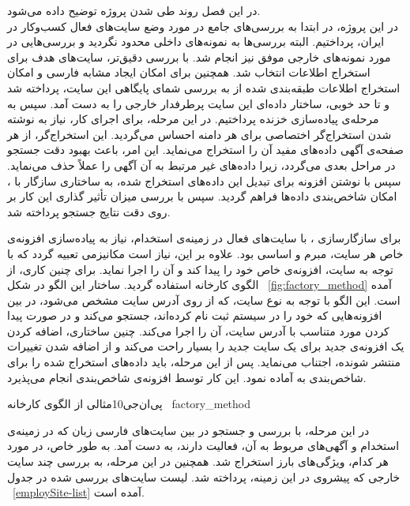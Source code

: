 
در اين فصل روند طی شدن پروژه توضيح داده می‌شود.
\\
در این پروژه، در ابتدا به بررسی‌های جامع در مورد وضع سایت‌های فعال کسب‌و‌کار در ایران، پرداختیم. البته بررسی‌ها به نمونه‌های داخلی محدود نگردید و بررسی‌هایی در مورد نمونه‌های خارجی موفق نیز انجام شد. با بررسی دقیق‌تر، سایت‌های هدف برای استخراج اطلاعات انتخاب شد. همچنین برای امکان ایجاد مشابه فارسی  و امکان استخراج اطلاعات طبقه‌بندی شده از  به بررسی شمای پایگاهی این سایت، پرداخته شد و تا حد خوبی، ساختار داده‌ای این سایت پرطرفدار خارجی را به دست آمد. سپس به مرحله‌ی پیاده‌سازی خزنده پرداختیم. در این مرحله، برای اجرای کار، نیاز به نوشته شدن استخراج‌گر اختصاصی برای هر دامنه احساس می‌گردید. این استخراج‌گر، از هر صفحه‌ی آگهی داده‌های مفید آن را استخراج می‌نماید. این امر، باعث بهبود دقت جستجو در مراحل بعدی می‌گردد، زیرا داده‌های غیر مرتبط به آن آگهی را عملاً حذف می‌نماید. سپس با نوشتن افزونه برای تبدیل این داده‌های استخراج شده، به ساختاری سازگار با ، امکان شاخص‌بندی داده‌ها فراهم گردید. سپس با بررسی میزان تأثیر گذاری این کار بر روی دقت نتایج جستجو پرداخته شد.

برای سازگارسازی ، با سایت‌های فعال در زمینه‌ی استخدام، نیاز به پیاده‌سازی افزونه‌ی خاص هر سایت، مبرم و اساسی بود. علاوه بر این، نیاز است مکانیزمی تعبیه گردد که با توجه به سایت، افزونه‌ی خاص خود را پیدا کند و آن را اجرا نماید. برای چنین کاری، از الگوی کارخانه استفاده گردید. ساختار این الگو در شکل ~\ref{fig:factory_method} آمده است. این الگو با توجه به نوع سایت، که از روی آدرس سایت مشخص می‌شود، در بین افزونه‌هایی که خود را در سیستم ثبت نام کرده‌اند، جستجو می‌کند و در صورت پیدا کردن مورد متناسب با آدرس سایت، آن را اجرا می‌کند. چنین ساختاری، اضافه کردن یک افزونه‌ی جدید برای یک سایت جدید را بسیار راحت می‌کند و از اضافه شدن تغییرات منتشر شونده، اجتناب می‌نماید. پس از این مرحله، باید داده‌های استخراج شده را برای شاخص‌بندی به  آماده نمود. این کار توسط افزونه‌ی شاخص‌بندی انجام می‌پذیرد.

‌پی‌ان‌جی{10}{مثالی از الگوی کارخانه
~\cite{Factory-method}}{factory_method}

در این مرحله، با بررسی و جستجو در بین سایت‌های فارسی زبان که در زمینه‌ی استخدام و آگهی‌های مربوط به آن، فعالیت دارند، به دست آمد. به طور خاص، در مورد هر کدام، ویژگی‌های بارز استخراج شد. همچنین در این مرحله، به بررسی چند سایت خارجی که پیشروی در این زمینه، پرداخته شد. لیست سایت‌های بررسی شده در جدول  ~\ref{employSite-list}  آمده است.

